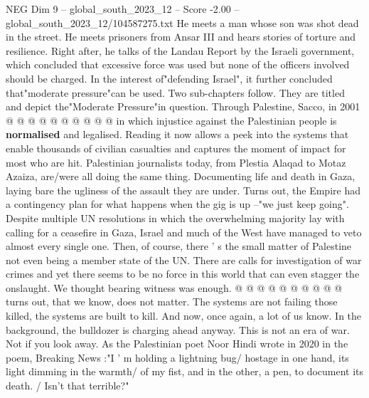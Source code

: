 \begin{textsample}{NEG Dim 9 – global\_south\_2023\_12 – Score -2.00 – global\_south\_2023\_12/104587275.txt}
He meets a man whose son was shot dead in the street.
He meets prisoners from Ansar III and hears stories of torture and resilience.
Right after, he talks of the Landau Report by the Israeli government, which concluded that excessive force was used but none of the officers involved should be charged.
In the interest of"defending Israel", it further concluded that"moderate pressure"can be used.
Two sub-chapters follow.
They are titled and depict the"Moderate Pressure"in question.
Through Palestine, Sacco, in 2001 @ @ @ @ @ @ @ @ @ @ in which injustice against the Palestinian people is \textbf{normalised} and legalised.
Reading it now allows a peek into the systems that enable thousands of civilian casualties and captures the moment of impact for most who are hit.
Palestinian journalists today, from Plestia Alaqad to Motaz Azaiza, are/were all doing the same thing.
Documenting life and death in Gaza, laying bare the ugliness of the assault they are under.
Turns out, the Empire had a contingency plan for what happens when the gig is up --"we just keep going".
Despite multiple UN resolutions in which the overwhelming majority lay with calling for a ceasefire in Gaza, Israel and much of the West have managed to veto almost every single one.
Then, of course, there ' s the small matter of Palestine not even being a member state of the UN.
There are calls for investigation of war crimes and yet there seems to be no force in this world that can even stagger the onslaught.
We thought bearing witness was enough. @ @ @ @ @ @ @ @ @ @ turns out, that we know, does not matter.
The systems are not failing those killed, the systems are built to kill.
And now, once again, a lot of us know.
In the background, the bulldozer is charging ahead anyway.
This is not an era of war.
Not if you look away.
As the Palestinian poet Noor Hindi wrote in 2020 in the poem, Breaking News :"I ' m holding a lightning bug/ hostage in one hand, its light dimming in the warmth/ of my fist, and in the other, a pen, to document its death. / Isn't that terrible?"

\end{textsample}
